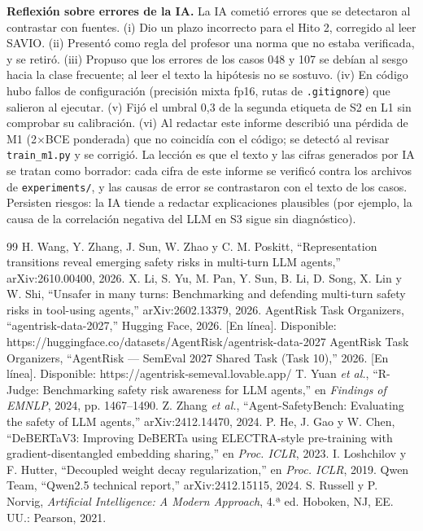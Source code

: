 \documentclass[conference]{IEEEtran}
\begin{document}
\textbf{Reflexión sobre errores de la IA.} La IA cometió errores que se detectaron al contrastar con fuentes. (i) Dio un plazo incorrecto para el Hito 2, corregido al leer SAVIO. (ii) Presentó como regla del profesor una norma que no estaba verificada, y se retiró. (iii) Propuso que los errores de los casos 048 y 107 se debían al sesgo hacia la clase frecuente; al leer el texto la hipótesis no se sostuvo. (iv) En código hubo fallos de configuración (precisión mixta fp16, rutas de \texttt{.gitignore}) que salieron al ejecutar. (v) Fijó el umbral 0,3 de la segunda etiqueta de S2 en L1 sin comprobar su calibración. (vi) Al redactar este informe describió una pérdida de M1 (2$\times$BCE ponderada) que no coincidía con el código; se detectó al revisar \texttt{train\_m1.py} y se corrigió. La lección es que el texto y las cifras generados por IA se tratan como borrador: cada cifra de este informe se verificó contra los archivos de \texttt{experiments/}, y las causas de error se contrastaron con el texto de los casos. Persisten riesgos: la IA tiende a redactar explicaciones plausibles (por ejemplo, la causa de la correlación negativa del LLM en S3 sigue sin diagnóstico).

\begin{thebibliography}{99}
 H. Wang, Y. Zhang, J. Sun, W. Zhao y C. M. Poskitt, ``Representation transitions reveal emerging safety risks in multi-turn LLM agents,'' arXiv:2610.00400, 2026.
 X. Li, S. Yu, M. Pan, Y. Sun, B. Li, D. Song, X. Lin y W. Shi, ``Unsafer in many turns: Benchmarking and defending multi-turn safety risks in tool-using agents,'' arXiv:2602.13379, 2026.
 AgentRisk Task Organizers, ``agentrisk-data-2027,'' Hugging Face, 2026. [En línea]. Disponible: https://huggingface.co/datasets/AgentRisk/agentrisk-data-2027
 AgentRisk Task Organizers, ``AgentRisk --- SemEval 2027 Shared Task (Task 10),'' 2026. [En línea]. Disponible: https://agentrisk-semeval.lovable.app/
 T. Yuan \emph{et al.}, ``R-Judge: Benchmarking safety risk awareness for LLM agents,'' en \emph{Findings of EMNLP}, 2024, pp. 1467--1490.
 Z. Zhang \emph{et al.}, ``Agent-SafetyBench: Evaluating the safety of LLM agents,'' arXiv:2412.14470, 2024.
 P. He, J. Gao y W. Chen, ``DeBERTaV3: Improving DeBERTa using ELECTRA-style pre-training with gradient-disentangled embedding sharing,'' en \emph{Proc. ICLR}, 2023.
 I. Loshchilov y F. Hutter, ``Decoupled weight decay regularization,'' en \emph{Proc. ICLR}, 2019.
 Qwen Team, ``Qwen2.5 technical report,'' arXiv:2412.15115, 2024.
 S. Russell y P. Norvig, \emph{Artificial Intelligence: A Modern Approach}, 4.ª ed. Hoboken, NJ, EE. UU.: Pearson, 2021.
\end{thebibliography}
\end{document}
